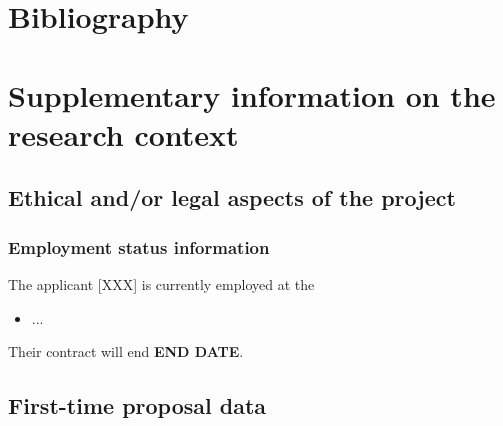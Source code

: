 \documentclass[a4paper,11pt]{article}
\begin{document}
\section{Bibliography}

{\fontsize{9}{11}\selectfont
%
%
}

\section{Supplementary information on the research context}

\subsection{Ethical and/or legal aspects of the project}

\subsubsection{Employment status information}
%

The applicant [XXX] is currently employed at the
\begin{itemize}
  \item ...
\end{itemize}
Their contract will end {\bf END DATE}.

\subsection{First-time proposal data}
\end{document}
